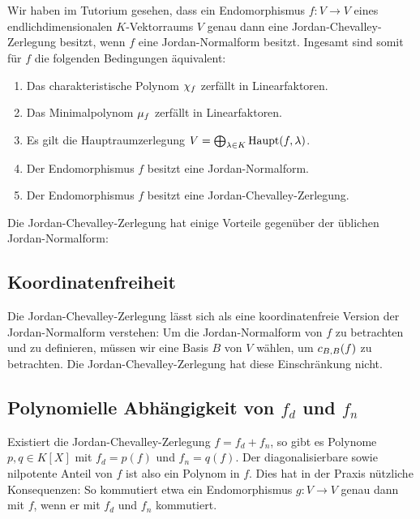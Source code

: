 \section{}

Wir haben im Tutorium gesehen, dass ein Endomorphismus $f \colon V \to V$ eines endlichdimensionalen $K$-Vektorraums $V$ genau dann eine Jordan-Chevalley-Zerlegung besitzt, wenn $f$ eine Jordan-Normalform besitzt.
Ingesamt sind somit für $f$ die folgenden Bedingungen äquivalent:

\begin{enumerate}
  \item
    Das charakteristische Polynom $\charpol{f}$ zerfällt in Linearfaktoren.
  \item
    Das Minimalpolynom $\minpol{f}$ zerfällt in Linearfaktoren.
  \item
    Es gilt die Hauptraumzerlegung $V = \bigoplus_{\lambda \in K} \hauptspace{f}{\lambda}$.
  \item
    Der Endomorphismus $f$ besitzt eine Jordan-Normalform.
  \item
    Der Endomorphismus $f$ besitzt eine Jordan-Chevalley-Zerlegung.
\end{enumerate}

Die Jordan-Chevalley-Zerlegung hat einige Vorteile gegenüber der üblichen Jordan-Normalform:



\subsection*{Koordinatenfreiheit}

Die Jordan-Chevalley-Zerlegung lässt sich als eine koordinatenfreie Version der Jordan-Normalform verstehen:
Um die Jordan-Normalform von $f$ zu betrachten und zu definieren, müssen wir eine Basis $B$ von $V$ wählen, um $\repmatrixendo{f}{B}$ zu betrachten.
Die Jordan-Chevalley-Zerlegung hat diese Einschränkung nicht.



\subsection*{Polynomielle Abhängigkeit von $f_d$ und $f_n$}

Existiert die Jordan-Chevalley-Zerlegung $f = f_d + f_n$, so gibt es Polynome $p, q \in K[X]$ mit $f_d = p(f)$ und $f_n = q(f)$.
Der diagonalisierbare sowie nilpotente Anteil von $f$ ist also ein Polynom in $f$.
Dies hat in der Praxis nützliche Konsequenzen:
So kommutiert etwa ein Endomorphismus $g \colon V \to V$ genau dann mit $f$, wenn er mit $f_d$ und $f_n$ kommutiert.

